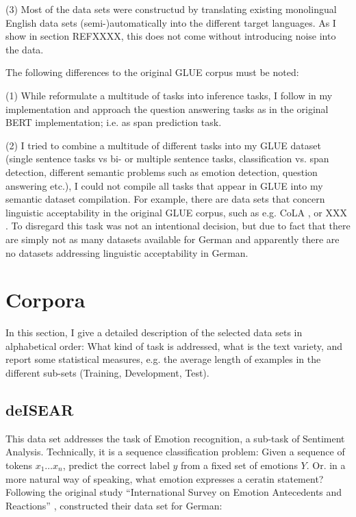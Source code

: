 (3) Most of the data sets were constructud by translating existing monolingual English
data sets (semi-)automatically into the different target languages. As I show in section
{\color{red} REFXXXX}, this does not come without introducing noise into the data.

The following differences to the original GLUE corpus must be noted:

(1) While \cite{wang2018glue} reformulate a multitude of tasks into inference tasks, I follow in
my implementation \cite{zhang2019semantics} and approach the question answering tasks as
\cite{devlin2018bert} in the original BERT implementation; i.e. as span prediction task.

(2) I tried to combine a multitude of different tasks into my GLUE dataset (single sentence tasks
vs bi- or multiple sentence tasks, classification vs. span detection, different semantic problems
such as emotion detection, question answering etc.), I could not compile all tasks that appear in
GLUE into my semantic dataset compilation.
For example, there are data sets that concern linguistic acceptability in the original GLUE
corpus, such as  e.g. CoLA \cite{warstadt2019neural}, or XXX .
To disregard this task was not an intentional decision, but due to fact that there are simply not
as many datasets available for German and apparently there are no datasets addressing linguistic
acceptability in German.

\section{Corpora}

In this section, I give a detailed description of the selected data sets in alphabetical order:
What kind of task is addressed, what is the text variety, and report some statistical measures,
e.g. the average length of examples in the different sub-sets (Training, Development, Test).

\subsection{deISEAR}



This data set addresses the task of Emotion recognition, a sub-task of Sentiment Analysis.
Technically, it is a sequence classification problem: Given a sequence of tokens $x_1 \dotso x_n$, predict the
correct label $y$ from a fixed set of emotions $Y$. Or. in a more natural way of speaking, what emotion
expresses a ceratin statement?
Following the original study ``International Survey on Emotion Antecedents and Reactions''
\citep{scherer1994evidence}, \cite{troiano2019crowdsourcing} constructed their data set for German:

